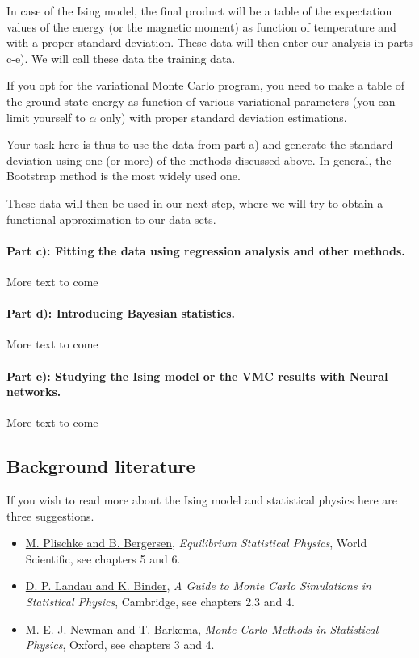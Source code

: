 \documentclass[%
oneside,                 %
final,                   %
10pt]{article}
\begin{document}
In case of the Ising model, the final product will be a table of the expectation values of the energy (or the magnetic moment) as function of temperature and with a proper standard deviation. These data will then enter our analysis in parts c-e). We will call these data the training data. 

If you opt for the variational Monte Carlo program, you need to make a table of the ground state energy as function of various variational parameters (you can limit yourself to $\alpha$ only) with proper standard deviation estimations.

Your task here is thus to use the data from part a) and generate the standard deviation using one (or more) of the methods discussed above. In general, the Bootstrap method is the most widely used one. 

These data will then be used in our next step, where we will try to obtain a functional approximation to our data sets. 

\paragraph{Part c): Fitting the data using regression analysis and other methods.}
More text to come
\paragraph{Part d): Introducing Bayesian statistics.}
More text to come

\paragraph{Part e): Studying the Ising model or the VMC results with Neural networks.}
More text to come

\subsection{Background literature}

If you wish to read more about the Ising model and statistical physics here are three suggestions.

\begin{itemize}
  \item \href{{http://www.worldscientific.com/worldscibooks/10.1142/5660}}{M. Plischke and B. Bergersen}, \emph{Equilibrium Statistical Physics}, World Scientific, see chapters 5 and 6.

  \item \href{{http://www.cambridge.org/no/academic/subjects/physics/computational-science-and-modelling/guide-monte-carlo-simulations-statistical-physics-4th-edition?format=HB}}{D. P. Landau and K. Binder}, \emph{A Guide to Monte Carlo Simulations in Statistical Physics}, Cambridge, see chapters 2,3 and 4.

  \item \href{{https://global.oup.com/academic/product/monte-carlo-methods-in-statistical-physics-9780198517979?cc=no&lang=en&}}{M. E. J. Newman and T. Barkema}, \emph{Monte Carlo Methods in Statistical Physics}, Oxford, see chapters 3 and 4.
\end{itemize}
\end{document}
